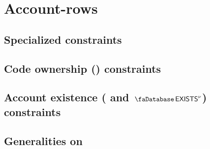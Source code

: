 \section{Account-rows}
\subsection{Specialized constraints                                           \lispTodo{}}    \label{hub: account: state access}              
\subsection{Code ownership (\accHasCode) constraints                          \lispDone{}}    \label{hub: account: empty code}                
\subsection{Account existence (\accExists{} and $\accExists\new$) constraints \lispDone{}}    \label{hub: account: account existence}         
\subsection{Generalities on \accRomLexFlag{}                                  \lispTodo{}}    \label{hub: account: rom lex flag generalities} 
